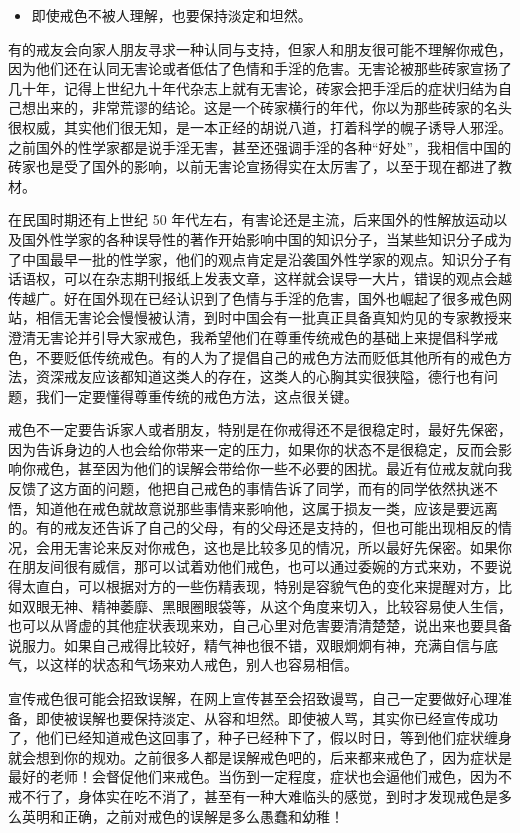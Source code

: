 \begin{itemize}
    \item 即使戒色不被人理解，也要保持淡定和坦然。
\end{itemize}

有的戒友会向家人朋友寻求一种认同与支持，但家人和朋友很可能不理解你戒色，因为他们还在认同无害论或者低估了色情和手淫的危害。无害论被那些砖家宣扬了几十年，记得上世纪九十年代杂志上就有无害论，砖家会把手淫后的症状归结为自己想出来的，非常荒谬的结论。这是一个砖家横行的年代，你以为那些砖家的名头很权威，其实他们很无知，是一本正经的胡说八道，打着科学的幌子诱导人邪淫。之前国外的性学家都是说手淫无害，甚至还强调手淫的各种“好处”，我相信中国的砖家也是受了国外的影响，以前无害论宣扬得实在太厉害了，以至于现在都进了教材。

在民国时期还有上世纪 50 年代左右，有害论还是主流，后来国外的性解放运动以及国外性学家的各种误导性的著作开始影响中国的知识分子，当某些知识分子成为了中国最早一批的性学家，他们的观点肯定是沿袭国外性学家的观点。知识分子有话语权，可以在杂志期刊报纸上发表文章，这样就会误导一大片，错误的观点会越传越广。好在国外现在已经认识到了色情与手淫的危害，国外也崛起了很多戒色网站，相信无害论会慢慢被认清，到时中国会有一批真正具备真知灼见的专家教授来澄清无害论并引导大家戒色，我希望他们在尊重传统戒色的基础上来提倡科学戒色，不要贬低传统戒色。有的人为了提倡自己的戒色方法而贬低其他所有的戒色方法，资深戒友应该都知道这类人的存在，这类人的心胸其实很狭隘，德行也有问题，我们一定要懂得尊重传统的戒色方法，这点很关键。

戒色不一定要告诉家人或者朋友，特别是在你戒得还不是很稳定时，最好先保密，因为告诉身边的人也会给你带来一定的压力，如果你的状态不是很稳定，反而会影响你戒色，甚至因为他们的误解会带给你一些不必要的困扰。最近有位戒友就向我反馈了这方面的问题，他把自己戒色的事情告诉了同学，而有的同学依然执迷不悟，知道他在戒色就故意说那些事情来影响他，这属于损友一类，应该是要远离的。有的戒友还告诉了自己的父母，有的父母还是支持的，但也可能出现相反的情况，会用无害论来反对你戒色，这也是比较多见的情况，所以最好先保密。如果你在朋友间很有威信，那可以试着劝他们戒色，也可以通过委婉的方式来劝，不要说得太直白，可以根据对方的一些伤精表现，特别是容貌气色的变化来提醒对方，比如双眼无神、精神萎靡、黑眼圈眼袋等，从这个角度来切入，比较容易使人生信，也可以从肾虚的其他症状表现来劝，自己心里对危害要清清楚楚，说出来也要具备说服力。如果自己戒得比较好，精气神也很不错，双眼炯炯有神，充满自信与底气，以这样的状态和气场来劝人戒色，别人也容易相信。

宣传戒色很可能会招致误解，在网上宣传甚至会招致谩骂，自己一定要做好心理准备，即使被误解也要保持淡定、从容和坦然。即使被人骂，其实你已经宣传成功了，他们已经知道戒色这回事了，种子已经种下了，假以时日，等到他们症状缠身就会想到你的规劝。之前很多人都是误解戒色吧的，后来都来戒色了，因为症状是最好的老师！会督促他们来戒色。当伤到一定程度，症状也会逼他们戒色，因为不戒不行了，身体实在吃不消了，甚至有一种大难临头的感觉，到时才发现戒色是多么英明和正确，之前对戒色的误解是多么愚蠢和幼稚！

